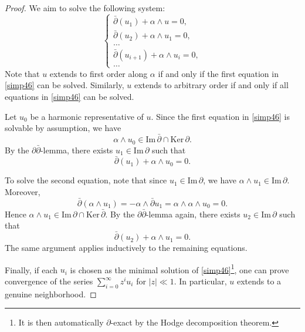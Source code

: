 \documentclass[10pt,a4paper]{amsart}
\newcommand{\dbar}{\bar \partial}
\newcommand{\im}{\mathrm{Im} \,}
\renewcommand{\ker}{\mathrm{Ker} \,}
\begin{document}
\begin{proof}
	We aim to solve the following system:
	\begin{equation}\label{simp46}
		\begin{cases}
			\dbar(u_1) + \alpha \wedge u = 0,\\
			\dbar(u_2) + \alpha \wedge u_1 = 0,\\
			\ldots\\
			\dbar(u_{i+1}) + \alpha \wedge u_i = 0,\\
			\ldots
		\end{cases}
	\end{equation}
	Note that $u$ extends to first order along $\alpha$ if and only if the first equation in \eqref{simp46} can be solved.
	Similarly, $u$ extends to arbitrary order if and only if all equations in \eqref{simp46} can be solved.
	
	Let $u_0$ be a harmonic representative of $u$. Since the first equation in \eqref{simp46} is solvable by assumption, we have
	\[
	\alpha \wedge u_0 \in \im \dbar \cap \ker \partial.
	\]
	By the $\partial\dbar$-lemma, there exists $u_1 \in \im \partial$ such that
	\[
	\dbar(u_1) + \alpha \wedge u_0 = 0.
	\]
	
	To solve the second equation, note that since $u_1 \in \im \partial$, we have $\alpha \wedge u_1 \in \im \partial$. Moreover,
	\[
	\dbar(\alpha \wedge u_1) = - \alpha \wedge \dbar u_1
	= \alpha \wedge \alpha \wedge u_0 = 0.
	\]
	Hence $\alpha \wedge u_1 \in \im \partial \cap \ker \dbar$.
	By the $\partial\dbar$-lemma again, there exists $u_2 \in \im \partial$ such that
	\[
	\dbar(u_2) + \alpha \wedge u_1 = 0.
	\]
	The same argument applies inductively to the remaining equations.
	
	Finally, if each $u_i$ is chosen as the minimal solution of \eqref{simp46}\footnote{It is then automatically $\partial$-exact by the Hodge decomposition theorem.},
	one can prove convergence of the series $\sum_{i=0}^\infty z^i u_i$ for $|z|\ll 1$.
	In particular, $u$ extends to a genuine neighborhood.
\end{proof}
\end{document}
